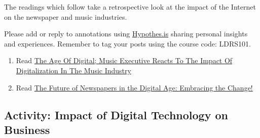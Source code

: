 \documentclass[
]{book}
\providecommand{\tightlist}{%
  \setlength{\itemsep}{0pt}\setlength{\parskip}{0pt}}
\theoremstyle{definition}
\theoremstyle{definition}
\theoremstyle{definition}
\theoremstyle{definition}
\theoremstyle{remark}
\begin{document}
\begin{reflect}
The readings which follow take a retrospective look at the impact of the Internet on the newspaper and music industries.

Please add or reply to annotations using \href{https://web.hypothes.is/}{Hypothes.is} sharing personal insights and experiences. Remember to tag your posts using the course code: LDRS101.

\begin{enumerate}
\def\labelenumi{\arabic{enumi}.}
\tightlist
\item
  Read \href{https://www.forbes.com/sites/joshwilson/2022/09/14/the-age-of-digital-music-executive-reacts-to-the-impact-of-digitalization-in-the-music-industry/?sh=1ca7f385537b}{The Age Of Digital; Music Executive Reacts To The Impact Of Digitalization In The Music Industry}
\item
  Read \href{https://medium.com/@kumarpriyanshu025/the-future-of-newspapers-in-the-digital-age-embracing-the-change-fe835bd8d52f}{The Future of Newspapers in the Digital Age: Embracing the Change!}
\end{enumerate}
\end{reflect}

\hypertarget{activity-impact-of-digital-technology-on-business}{%
\subsection*{Activity: Impact of Digital Technology on Business}\label{activity-impact-of-digital-technology-on-business}}
\end{document}
